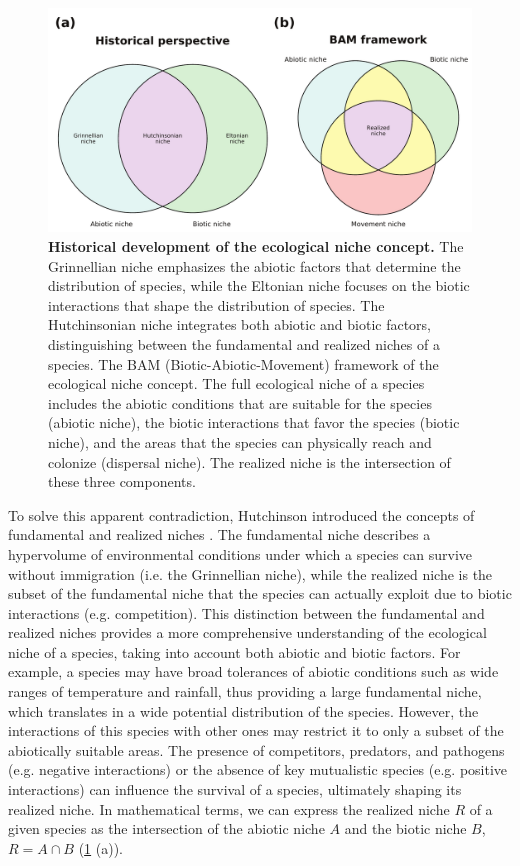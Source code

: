 \begin{figure}[H]
  \centering
  \includegraphics[width=1\textwidth]{Figures/Niche_theory.pdf}
  \caption[Historical development of the ecological niche concept]{
    \textbf{Historical development of the ecological niche concept.} The
    Grinnellian niche emphasizes the abiotic factors that determine the
    distribution of species, while the Eltonian niche focuses on the biotic
    interactions that shape the distribution of species. The Hutchinsonian
    niche integrates both abiotic and biotic factors, distinguishing
    between the fundamental and realized niches of a species. The BAM
    (Biotic-Abiotic-Movement) framework of the ecological niche concept. The
    full ecological niche of a species includes the abiotic conditions that are
    suitable for the species (abiotic niche), the biotic interactions that
    favor the species (biotic niche), and the areas that the species can
    physically reach and colonize (dispersal niche). The realized niche is the
    intersection of these three components.}
  \label{fig:niche_concept}
\end{figure}

To solve this apparent contradiction, Hutchinson introduced the concepts of
fundamental and realized niches \cite{Hutchinson1957}. The fundamental niche
describes a hypervolume of environmental conditions under which a species can
survive without immigration (i.e. the Grinnellian niche), while the realized
niche is the subset of the fundamental niche that the species can actually
exploit due to biotic interactions (e.g. competition). This distinction between
the fundamental and realized niches provides a more comprehensive understanding
of the ecological niche of a species, taking into account both abiotic and
biotic factors. For example, a species may have broad tolerances of abiotic
conditions such as wide ranges of temperature and rainfall, thus providing a
large fundamental niche, which translates in a wide potential distribution of
the species. However, the interactions of this species with other ones may
restrict it to only a subset of the abiotically suitable areas. The presence of
competitors, predators, and pathogens (e.g. negative interactions) or the
absence of key mutualistic species (e.g. positive interactions) can influence
the survival of a species, ultimately shaping its realized niche. In
mathematical terms, we can express the realized niche $R$ of a given species as
the intersection of the abiotic niche $A$ and the biotic niche $B$, $R=A\cap
  B$ (\cref{fig:niche_concept} (a)).

